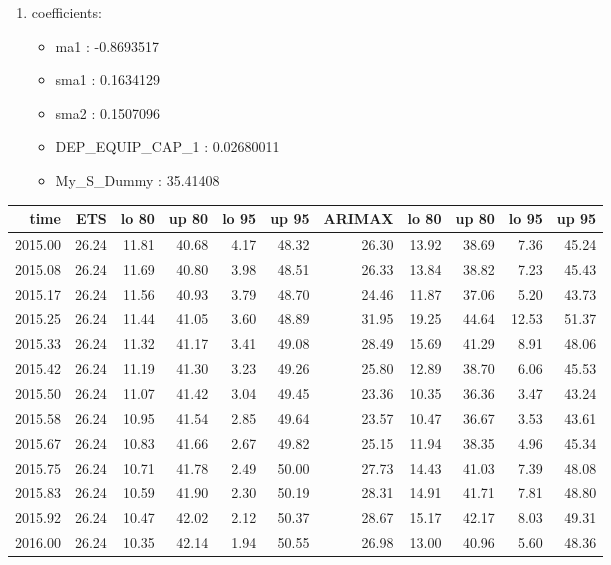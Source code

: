 \documentclass[10pt,a4paper]{article}\usepackage[]{graphicx}\usepackage[]{color}
\newcommand{\AaA}{\_}
\begin{document}
\begin{multicols}{2}
\begin{enumerate}
\item coefficients:
\begin{itemize}
\item  ma1 :  -0.8693517 
\item  sma1 :  0.1634129 
\item  sma2 :  0.1507096 
\item  DEP\AaA EQUIP\AaA CAP\AaA 1 :  0.02680011 
\item  My_S_Dummy :  35.41408 
\end{itemize}
\end{enumerate}
\end{multicols}
\begin{table}[ht]
\centering
\begin{tabular}{rrrrrrrrrrr}
  \hline
time & ETS  & lo 80 & up 80 & lo 95 & up 95 & ARIMAX  & lo 80 & up 80 & lo 95 & up 95 \\ 
  \hline
2015.00 & 26.24 & 11.81 & 40.68 & 4.17 & 48.32 & 26.30 & 13.92 & 38.69 & 7.36 & 45.24 \\ 
  2015.08 & 26.24 & 11.69 & 40.80 & 3.98 & 48.51 & 26.33 & 13.84 & 38.82 & 7.23 & 45.43 \\ 
  2015.17 & 26.24 & 11.56 & 40.93 & 3.79 & 48.70 & 24.46 & 11.87 & 37.06 & 5.20 & 43.73 \\ 
  2015.25 & 26.24 & 11.44 & 41.05 & 3.60 & 48.89 & 31.95 & 19.25 & 44.64 & 12.53 & 51.37 \\ 
  2015.33 & 26.24 & 11.32 & 41.17 & 3.41 & 49.08 & 28.49 & 15.69 & 41.29 & 8.91 & 48.06 \\ 
  2015.42 & 26.24 & 11.19 & 41.30 & 3.23 & 49.26 & 25.80 & 12.89 & 38.70 & 6.06 & 45.53 \\ 
  2015.50 & 26.24 & 11.07 & 41.42 & 3.04 & 49.45 & 23.36 & 10.35 & 36.36 & 3.47 & 43.24 \\ 
  2015.58 & 26.24 & 10.95 & 41.54 & 2.85 & 49.64 & 23.57 & 10.47 & 36.67 & 3.53 & 43.61 \\ 
  2015.67 & 26.24 & 10.83 & 41.66 & 2.67 & 49.82 & 25.15 & 11.94 & 38.35 & 4.96 & 45.34 \\ 
  2015.75 & 26.24 & 10.71 & 41.78 & 2.49 & 50.00 & 27.73 & 14.43 & 41.03 & 7.39 & 48.08 \\ 
  2015.83 & 26.24 & 10.59 & 41.90 & 2.30 & 50.19 & 28.31 & 14.91 & 41.71 & 7.81 & 48.80 \\ 
  2015.92 & 26.24 & 10.47 & 42.02 & 2.12 & 50.37 & 28.67 & 15.17 & 42.17 & 8.03 & 49.31 \\ 
  2016.00 & 26.24 & 10.35 & 42.14 & 1.94 & 50.55 & 26.98 & 13.00 & 40.96 & 5.60 & 48.36 \\ 

\end{tabular}
\end{table}
\end{document}
